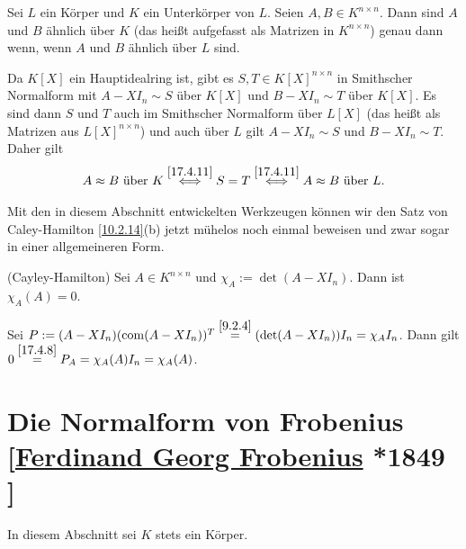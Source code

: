 \documentclass[../../main.tex]{subfiles}
\begin{document}
\begin{pro}\label{17.4.14}
Sei $L$ ein Körper und $K$ ein Unterkörper von $L$. Seien $A,B\in K^{n\times n}$. Dann sind $A$ und $B$ ähnlich über $K$ (das heißt aufgefasst als Matrizen in $K^{n\times n}$) genau dann wenn, wenn $A$ und $B$ ähnlich über $L$ sind.
\end{pro}
\begin{cproof}
Da $K[X]$ ein Hauptidealring ist, gibt es $S,T\in K[X]^{n\times n}$ in Smithscher Normalform mit $A-XI_n\sim S$ über $K[X]$ und $B-XI_n\sim T$ über $K[X]$. Es sind dann $S$ und $T$ auch im Smithscher Normalform über $L[X]$ (das heißt als Matrizen aus $L[X]^{n\times n}$) und auch über $L$ gilt $A-XI_n\sim S$ und $B-XI_n\sim T$. Daher gilt
\begin{align*}
A\approx B\text{ über }K\stackrel{\ref{17.4.11}}{\Longleftrightarrow}S=T \stackrel{\ref{17.4.11}}{\Longleftrightarrow}A\approx B\text{ über }L.
\end{align*}
\end{cproof}

Mit den in diesem Abschnitt entwickelten Werkzeugen können wir den Satz von Caley-Hamilton \ref{10.2.14}(b) jetzt mühelos noch einmal beweisen und zwar sogar in einer allgemeineren Form.

\begin{sat}\label{17.4.15}
(Cayley-Hamilton) Sei $A\in K^{n\times n}$ und $\chi_A:=\det(A-XI_n)$. Dann ist $\chi_A(A)=0$.
\end{sat}
\begin{cproof}
Sei $P:=(A-XI_n)(\operatorname{com}(A-XI_n))^T\stackrel{\ref{9.2.4}}{=}(\det(A-XI_n))I_n=\chi_AI_n$. Dann gilt $0\stackrel{\ref{17.4.8}}{=}P_A=\chi_A(A)I_n=\chi_A(A)$.
\end{cproof}

\section[Die Normalform von Frobenius]{Die Normalform von Frobenius\\{\small[\href{https://de.wikipedia.org/wiki/Ferdinand_Georg_Frobenius}{Ferdinand Georg Frobenius} *1849 }]}
In diesem Abschnitt sei $K$ stets ein Körper.
\end{document}

